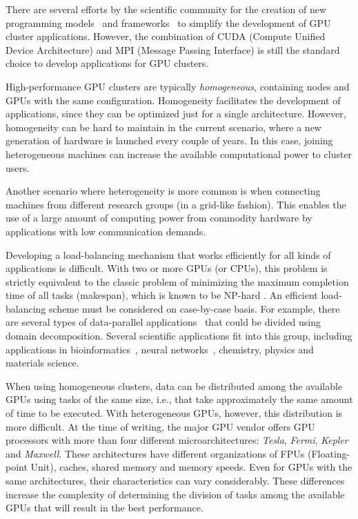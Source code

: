 \documentclass[journal]{IEEEtran}
\begin{document}
There are several efforts by the scientific community for the creation of new
programming models~\cite{appCientificas, wave} and frameworks~\cite{snucl, Flat,
  starpu} to simplify the development of GPU cluster
applications. However, the combination of CUDA (Compute Unified Device
Architecture) and MPI (Message Passing Interface) is still the standard choice
to develop applications for GPU clusters.

High-performance GPU clusters are typically \emph{homogeneous}, containing nodes
and GPUs with the same configuration. Homogeneity facilitates the development of
applications, since they can be optimized just for a single
architecture. %
However, homogeneity can be hard to maintain in the current scenario,
where a new generation of hardware is launched every couple of years. In
this case, joining heterogeneous machines can increase the available
computational power to cluster users.

Another scenario where heterogeneity is more common is when connecting machines
from different research groups (in a grid-like fashion). This enables the use of
a large amount of computing power from commodity hardware 
by applications with low communication demands.%

Developing a load-balancing mechanism that works efficiently for all kinds of
applications is difficult. With two or more GPUs (or CPUs), this problem is
strictly equivalent to the classic problem of minimizing the maximum completion
time of all tasks (makespan), which is known to be NP-hard \cite{GaJo1979}. An
efficient load-balancing scheme must be considered on case-by-case basis. For
example, there are several types of data-parallel
applications~\cite{Gropp:1992uq} that could be divided using domain
decomposition. Several scientific applications fit into this group, including
applications in bioinformatics~\cite{bioinformatica2}, neural
networks~\cite{neural}, chemistry, physics and materials science.

When using homogeneous clusters, data can be distributed among the available
GPUs using tasks of the same size, i.e., that take approximately the same amount of time to be executed. With heterogeneous GPUs, however, this
distribution is more difficult. At the time of writing, the major GPU vendor offers GPU processors with more than four different microarchitectures: \emph{Tesla},​ \emph{Fermi}, \emph{Kepler} and \emph{Maxwell}. These
architectures have different organizations of FPUs (Floating-point Unit),
caches, shared memory and memory speeds. Even for GPUs with the same
architectures, their characteristics can vary considerably. These differences increase the complexity of determining the division of tasks among the available GPUs that will result in the best performance.
\end{document}
